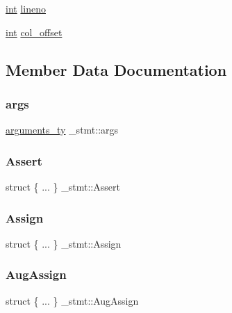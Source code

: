 \begin{DoxyCompactItemize}
\begin{tabbing}
\end{tabbing}\item 
\mbox{\hyperlink{warnings_8h_a74f207b5aa4ba51c3a2ad59b219a423b}{int}} \mbox{\hyperlink{struct__stmt_a80852961a5875977df5769033d8039d4}{lineno}}
\item 
\mbox{\hyperlink{warnings_8h_a74f207b5aa4ba51c3a2ad59b219a423b}{int}} \mbox{\hyperlink{struct__stmt_aa2948b6a670a4b66a09dc3eaf022bbf2}{col\+\_\+offset}}
\end{DoxyCompactItemize}


\subsection{Member Data Documentation}
\mbox{\label{struct__stmt_ac731167ba143dd9aa967900ec61abedf}} 
\subsubsection{\texorpdfstring{args}{args}}
{\footnotesize\ttfamily \mbox{\hyperlink{_python-ast_8h_a45cc6e94d598fdc335d8c85739108a3e}{arguments\+\_\+ty}} \+\_\+stmt\+::args}

\mbox{\label{struct__stmt_aa86cd57e5089757765d27a151dd0ba42}} 
\subsubsection{\texorpdfstring{Assert}{Assert}}
{\footnotesize\ttfamily struct \{ ... \}   \+\_\+stmt\+::\+Assert}

\mbox{\label{struct__stmt_a8508aa8bc3f7b13aab32cb29ab4f0503}} 
\subsubsection{\texorpdfstring{Assign}{Assign}}
{\footnotesize\ttfamily struct \{ ... \}   \+\_\+stmt\+::\+Assign}

\mbox{\label{struct__stmt_a016245fd0b16e868821eae2bafb79dd2}} 
\subsubsection{\texorpdfstring{AugAssign}{AugAssign}}
{\footnotesize\ttfamily struct \{ ... \}   \+\_\+stmt\+::\+Aug\+Assign}

